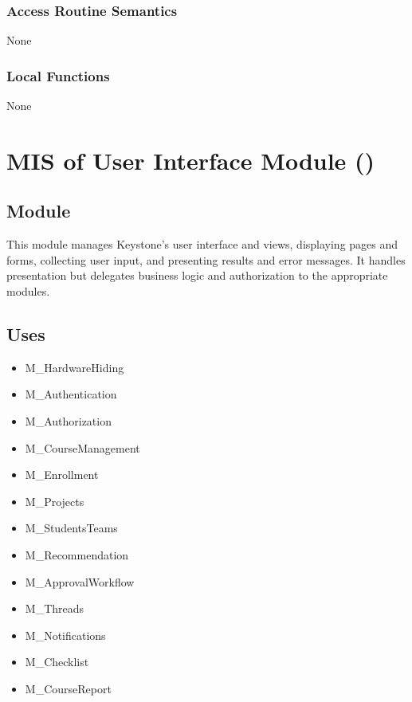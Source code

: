 \documentclass[12pt, titlepage]{article}
\newcommand{\moduleid}[1]{\texttt{\detokenize{#1}}}
\begin{document}
\subsubsection{Access Routine Semantics}

None

\subsubsection{Local Functions}

 
None

\newpage

\section[MIS of User Interface Module]{MIS of User Interface Module (\moduleid{M_UserInterface})}
\label{M_UserInterface}

\subsection{Module}

This module manages Keystone's user interface and views, displaying pages and forms, collecting user input, and presenting results and error messages. It handles presentation but delegates business logic and authorization to the appropriate modules.

\subsection{Uses}

\begin{itemize}
    \item M\_HardwareHiding
    \item M\_Authentication
    \item M\_Authorization
    \item M\_CourseManagement
    \item M\_Enrollment
    \item M\_Projects
    \item M\_StudentsTeams
    \item M\_Recommendation
    \item M\_ApprovalWorkflow
    \item M\_Threads
    \item M\_Notifications
    \item M\_Checklist
    \item M\_CourseReport
\end{itemize}
\end{document}
